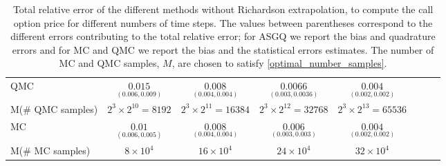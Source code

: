 \begin{table}[h!]
\begin{small}
\begin{tabular}{l*{6}{c}r}
			
			\hline
			QMC    & $\underset{(0.006,0.009)}{\mathbf{0.015}}$  & $\underset{(0.004,0.004)}{ \mathbf{0.008}}$  & $\underset{(0.003,0.0036)}{\mathbf{0.0066}}$ & $\underset{(0.002,0.002)}{\mathbf{0.004}}$  \\	
			M(\# QMC samples) 	& $2^3 \times 2^{10}= 8192$  &  $2^3 \times 2^{11}=  16384$ &  $2^3 \times 2^{12}= 32768$ & $2^3 \times 2^{13}= 65536	$  \\
			\hline
			MC    & $\underset{(0.006,0.005)}{\mathbf{0.01}}$  & $\underset{(0.004,0.004)}{ \mathbf{0.008}}$  & $\underset{(0.003,0.003)}{\mathbf{0.006}}$ & $\underset{(0.002,0.002)}{\mathbf{0.004}}$  \\	
			M(\# MC samples) 	& $8 \times 10^4$  & $16 \times 10^4$  & $24 \times 10^4$ & $32 \times 10^4$  \\
			\bottomrule[1.25pt]
		\end{tabular}
		\caption{Total relative error of  the different methods without Richardson extrapolation,  to compute the call option price  for different numbers of time steps. The values between parentheses correspond to the different errors contributing to the total relative error; for ASGQ we report the bias and quadrature errors and for MC and QMC we report the bias and the statistical errors estimates. The number of MC and QMC  samples, $M$, are chosen to satisfy \eqref{optimal_number_samples}.}
		\label{Total error of MISC and MC to compute Call option price of the different tolerances for different number of time steps. Case set 4, without Richardson extrapolation. The numbers between parentheses are the corresponding absolute errors.}
	\end{small}
\end{table}

